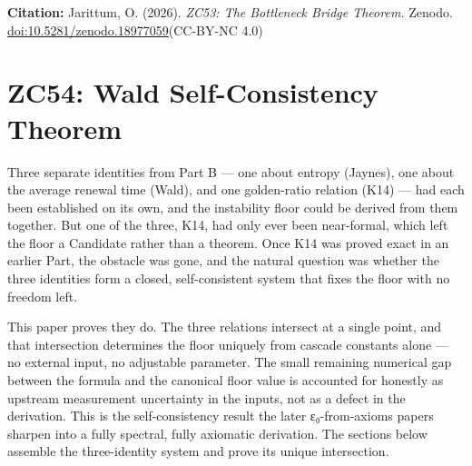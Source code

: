 \documentclass[12pt, a4paper]{article}
\begin{document}
\bigskip
\begin{center}
\textbf{Citation:} Jarittum, O. (2026).
\textit{ZC53: The Bottleneck Bridge Theorem.}
Zenodo.
\href{https://doi.org/10.5281/zenodo.18977059}%
{doi:10.5281/zenodo.18977059}\quad (CC-BY-NC 4.0)
\end{center}


\section{ZC54: Wald Self-Consistency Theorem}

Three separate identities from Part B --- one about entropy (Jaynes), one about
the average renewal time (Wald), and one golden-ratio relation (K14) --- had each
been established on its own, and the instability floor could be derived from them
together. But one of the three, K14, had only ever been near-formal, which left
the floor a Candidate rather than a theorem. Once K14 was proved exact in an
earlier Part, the obstacle was gone, and the natural question was whether the
three identities form a closed, self-consistent system that fixes the floor with
no freedom left.

This paper proves they do. The three relations intersect at a single point, and
that intersection determines the floor uniquely from cascade constants alone ---
no external input, no adjustable parameter. The small remaining numerical gap
between the formula and the canonical floor value is accounted for honestly as
upstream measurement uncertainty in the inputs, not as a defect in the
derivation. This is the self-consistency result the later ε₀-from-axioms papers
sharpen into a fully spectral, fully axiomatic derivation. The sections below
assemble the three-identity system and prove its unique intersection.
\label{sec:zc54}
\end{document}
